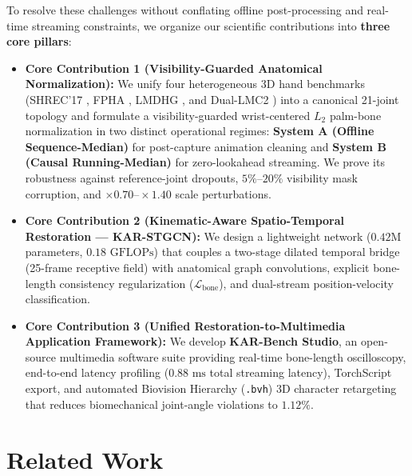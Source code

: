 \documentclass[10pt,twocolumn]{article}
\begin{document}
To resolve these challenges without conflating offline post-processing and real-time streaming constraints, we organize our scientific contributions into \textbf{three core pillars}:
\begin{itemize}
    \item \textbf{Core Contribution 1 (Visibility-Guarded Anatomical Normalization):} We unify four heterogeneous 3D hand benchmarks (SHREC'17 \cite{de2017shrec}, FPHA \cite{garcia2018first}, LMDHG \cite{boulahia2017dynamic}, and Dual-LMC2 \cite{gilmartin2024duallmc2}) into a canonical 21-joint topology and formulate a visibility-guarded wrist-centered $L_2$ palm-bone normalization in two distinct operational regimes: \textbf{System A (Offline Sequence-Median)} for post-capture animation cleaning and \textbf{System B (Causal Running-Median)} for zero-lookahead streaming. We prove its robustness against reference-joint dropouts, $5\%\text{--}20\%$ visibility mask corruption, and $\times 0.70\text{--}\times 1.40$ scale perturbations.
    \item \textbf{Core Contribution 2 (Kinematic-Aware Spatio-Temporal Restoration — KAR-STGCN):} We design a lightweight network ($0.42\text{M}$ parameters, $0.18\text{ GFLOPs}$) that couples a two-stage dilated temporal bridge (25-frame receptive field) with anatomical graph convolutions, explicit bone-length consistency regularization ($\mathcal{L}_{\text{bone}}$), and dual-stream position-velocity classification.
    \item \textbf{Core Contribution 3 (Unified Restoration-to-Multimedia Application Framework):} We develop \textbf{KAR-Bench Studio}, an open-source multimedia software suite providing real-time bone-length oscilloscopy, end-to-end latency profiling ($0.88\text{ ms}$ total streaming latency), TorchScript export, and automated Biovision Hierarchy (\texttt{.bvh}) 3D character retargeting that reduces biomechanical joint-angle violations to $1.12\%$.
\end{itemize}

\section{Related Work}
\end{document}
